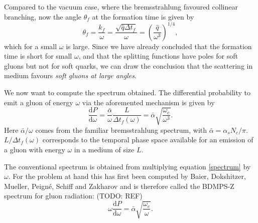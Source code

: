 \documentclass[a4paper,12pt]{article}
\numberwithin{equation}{section}
\begin{document}
Compared to the vacuum case, where the bremsstrahlung favoured collinear branching, now the angle $\theta_f$ at the formation time is given by
\begin{equation}
\theta_f=\frac{k_f}{\omega}=\frac{\sqrt{\hat{q}\Delta t_f}}{\omega}=\left( \frac{\hat{q}}{\omega^3} \right)^{1/4},
\end{equation}
which for a small $\omega$ is large. Since we have already concluded that the formation time is short for small $\omega$, and that the splitting functions have poles for soft gluons but not for soft quarks, we can draw the conclusion that the scattering in medium favours \emph{soft gluons at large angles}.



We now want to compute the spectrum obtained. The differential probability to emit a gluon of energy $\omega$ via the aforemented mechanism is given by 
\begin{equation}\label{spectrum}
\frac{\mathrm{d}P}{\mathrm{d}\omega} =\frac{\bar{\alpha}}{\omega}\frac{L}{\Delta t_f(\omega)}= \bar{\alpha}\sqrt{\frac{\omega_c}{\omega^3}}.
\end{equation}
Here ${\bar{\alpha}}/{\omega}$ comes from the familiar bremsstrahlung spectrum, with $\bar{\alpha}={\alpha_s N_c}/{\pi}$. ${L}/{\Delta t_f(\omega)}$ corresponds to the temporal phase space available for an emission of a gluon with energy $\omega$ in a medium of size $L$. 

The conventional spectrum is obtained from multiplying equation \eqref{spectrum} by $\omega$. For the problem at hand this has first been computed by Baier, Dokshitzer, Mueller, Peigné, Schiff and Zakharov and is therefore called the BDMPS-Z spectrum for gluon radiation: (TODO: REF)
\begin{equation}\label{BDMPS}
\omega \frac{\mathrm{d}P}{\mathrm{d}\omega} =\bar{\alpha}\sqrt{\frac{\omega_c}{\omega}}.
\end{equation}
\end{document}
